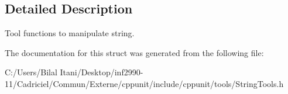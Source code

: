 \subsection{Detailed Description}
Tool functions to manipulate string. 

The documentation for this struct was generated from the following file\+:\begin{DoxyCompactItemize}
\item 
C\+:/\+Users/\+Bilal Itani/\+Desktop/inf2990-\/11/\+Cadriciel/\+Commun/\+Externe/cppunit/include/cppunit/tools/String\+Tools.\+h\end{DoxyCompactItemize}
